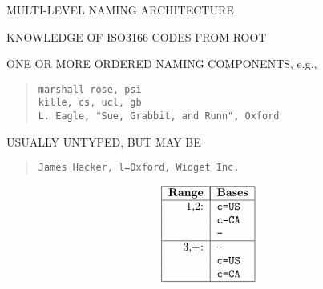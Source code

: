 \begin{bwslide}

\begin{nrtc}
\item	MULTI-LEVEL NAMING ARCHITECTURE

\item	KNOWLEDGE OF ISO3166 CODES FROM ROOT
\end{nrtc}
\end{bwslide}


\begin{bwslide}

\begin{nrtc}
\item	ONE OR MORE ORDERED NAMING COMPONENTS, e.g.,
\begin{quote}\small\begin{verbatim}
marshall rose, psi
kille, cs, ucl, gb
L. Eagle, "Sue, Grabbit, and Runn", Oxford
\end{verbatim}\end{quote}

\item	USUALLY UNTYPED, BUT MAY BE
\begin{quote}\small\begin{verbatim}
James Hacker, l=Oxford, Widget Inc.
\end{verbatim}\end{quote}
\end{nrtc}
\end{bwslide}


\begin{bwslide}

\[\begin{tabular}{|r|l|}
\hline
\multicolumn{1}{|c|}{\bf Range}&
		\multicolumn{1}{|c|}{\bf Bases}\\
\hline
1,2:&		\tt c=US\\
&		\tt c=CA\\
&		\tt -\\
\hline
3,+:&		\tt -\\
&		\tt c=US\\
&		\tt c=CA\\
\hline
\end{tabular}\]
\end{bwslide}


